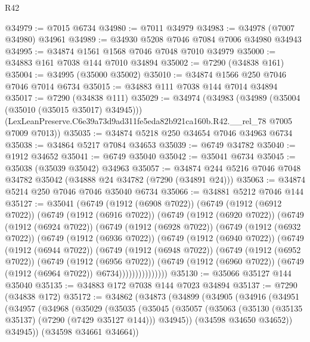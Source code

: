 \begin{lexlean}{R42}
\begin{coremodule}
{@34979 := @7015 @6734
@34980 := @7011 @34979
@34983 := @34978 (@7007 @34980) @34961
@34989 := @34930 @5208 @7046 @7084 @7006 @34980 @34943
@34995 := @34874 @1561 @1568 @7046 @7048 @7010 @34979
@35000 := @34883 @161 @7038 @144 @7010 @34894
@35002 := @7290 (@34838 @161)
@35004 := @34995 (@35000 @35002)
@35010 := @34874 @1566 @250 @7046 @7046 @7014 @6734
@35015 := @34883 @111 @7038 @144 @7014 @34894
@35017 := @7290 (@34838 @111)
@35029 := @34974
    (@34983
      (@34989 (@35004 (@35010 (@35015 @35017) @34945)))
      (LexLeanPreserve.C6e39a73d9ad311fe5eda82b921ca160b.R42.__rel_78 @7005 @7009 @7013))
@35035 := @34874 @5218 @250 @34654 @7046 @34963 @6734
@35038 := @34864 @5217 @7084 @34653
@35039 := @6749 @34782
@35040 := @1912 @34652
@35041 := @6749 @35040
@35042 := @35041 @6734
@35045 := @35038 (@35039 @35042) @34963
@35057 := @34874 @244 @5216 @7046 @7048 @34782 @35042 (@34888 @24 @34782 (@7290 (@34891 @24)))
@35063 := @34874 @5214 @250 @7046 @7046 @35040 @6734
@35066 := @34881 @5212 @7046 @144
@35127 := @35041
    (@6749
      (@1912 (@6908 @7022))
      (@6749
        (@1912 (@6912 @7022))
        (@6749
          (@1912 (@6916 @7022))
          (@6749
            (@1912 (@6920 @7022))
            (@6749
              (@1912 (@6924 @7022))
              (@6749
                (@1912 (@6928 @7022))
                (@6749
                  (@1912 (@6932 @7022))
                  (@6749
                    (@1912 (@6936 @7022))
                    (@6749
                      (@1912 (@6940 @7022))
                      (@6749
                        (@1912 (@6944 @7022))
                        (@6749
                          (@1912 (@6948 @7022))
                          (@6749
                            (@1912 (@6952 @7022))
                            (@6749
                              (@1912 (@6956 @7022))
                              (@6749
                                (@1912 (@6960 @7022))
                                (@6749 (@1912 (@6964 @7022)) @6734)))))))))))))))
@35130 := @35066 @35127 @144 @35040
@35135 := @34883 @172 @7038 @144 @7023 @34894
@35137 := @7290 (@34838 @172)
@35172 := @34862
    (@34873
      (@34899
        (@34905
          (@34916
            (@34951
              (@34957
                (@34968
                  (@35029
                    (@35035
                      (@35045
                        (@35057
                          (@35063 (@35130 (@35135 @35137) (@7290 (@7429 @35127 @144))) @34945))
                        (@34598 @34650 @34652))
                      @34945))
                  (@34598 @34661 @34664))
}
\end{coremodule}
\end{lexlean}
